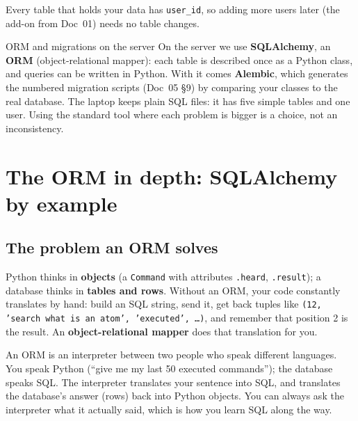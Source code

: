 \documentclass[11pt,a4paper]{article}
\begin{document}
\noindent Every table that holds your data has \texttt{user\_id}, so adding more users later
(the add-on from Doc~01) needs no table changes.

\begin{concept}{ORM and migrations on the server}
On the server we use \textbf{SQLAlchemy}, an \textbf{ORM} (object-relational mapper): each table
is described once as a Python class, and queries can be written in Python. With it comes
\textbf{Alembic}, which generates the numbered migration scripts (Doc~05 \S9) by comparing your
classes to the real database. The laptop keeps plain SQL files: it has five simple tables and
one user. Using the standard tool where each problem is bigger is a choice, not an inconsistency.
\end{concept}

\section{The ORM in depth: SQLAlchemy by example}

\subsection{The problem an ORM solves}
Python thinks in \textbf{objects} (a \texttt{Command} with attributes \texttt{.heard},
\texttt{.result}); a database thinks in \textbf{tables and rows}. Without an ORM, your code
constantly translates by hand: build an SQL string, send it, get back tuples like
\texttt{(12, 'search what is an atom', 'executed', \ldots)}, and remember that position 2 is the
result. An \textbf{object-relational mapper} does that translation for you.

\begin{analogy}
An ORM is an interpreter between two people who speak different languages. You speak Python
(``give me my last 50 executed commands''); the database speaks SQL. The interpreter translates
your sentence into SQL, and translates the database's answer (rows) back into Python objects.
You can always ask the interpreter what it actually said, which is how you learn SQL along the way.
\end{analogy}
\end{document}
